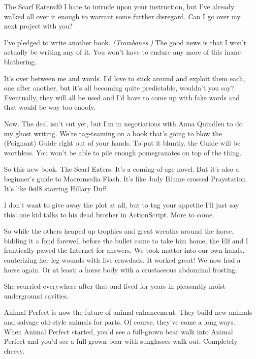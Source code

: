 \documentclass[10pt,twoside]{report}
\begin{document}
	\begin{sidebar}{The Scarf Eaters}{40}
		I hate to intrude upon your instruction, but I've already walked all over it enough to warrant some further disregard. Can I go over my next project with you?\vspace{6px}
		
I've pledged to write another book. \textit{(Trombones.)} The good news is that I won't actually be writing any of it. You won't have to endure any more of this inane blathering.\vspace{6px}

It's over between me and words. I'd love to stick around and exploit them each, one after another, but it's all becoming quite predictable, wouldn't you say? Eventually, they will all be used and I'd have to come up with fake words and that would be way too cnoofy.\vspace{6px}

	Now. The deal isn't cut yet, but I'm in negotiations with Anna Quindlen to do my ghost writing. We're tag-teaming on a book that's going to blow the (Poignant) Guide right out of your hands. To put it bluntly, the Guide will be worthless. You won't be able to pile enough pomegranates on top of the thing.\vspace{6px}
	
So this new book. The Scarf Eaters. It's a coming-of-age novel. But it's also a beginner's guide to Macromedia Flash. It's like Judy Blume crossed Praystation. It's like 0sil8 starring Hillary Duff.\vspace{6px}

I don't want to give away the plot at all, but to tug your appetite I'll just say this: one kid talks to his dead brother in ActionScript. More to come.
	\end{sidebar}

So while the others heaped up trophies and great wreaths around the
horse, bidding it a fond farewell before the bullet came to take him
home, the Elf and I frantically pawed the Internet for answers.  We
took matter into our own hands, cauterizing her leg wounds with live
crawdads.  It worked great!  We now had a horse again.  Or at least: a
horse body with a crustaceous abdominal frosting.

She scurried everywhere after that and lived for years in pleasantly
moist underground cavities.

Animal Perfect is now the future of animal enhancement.  They build
new animals and salvage old-style animals for parts.  Of course,
they've come a long ways. When Animal Perfect started, you'd see a
full-grown bear walk into Animal Perfect and you'd see a full-grown
bear with sunglasses walk out.  Completely cheesy.
\end{document}
